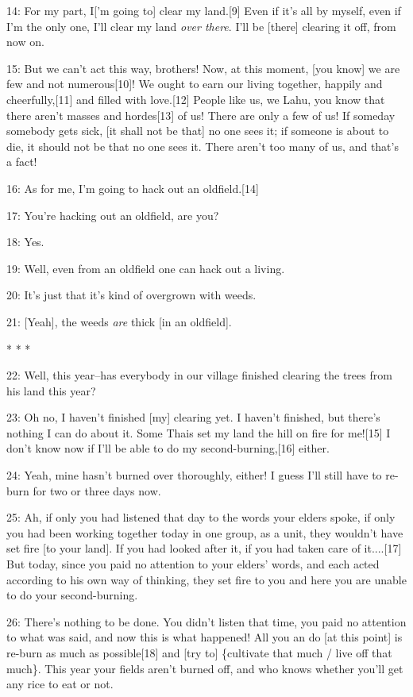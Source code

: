 14: For my part, I['m going to] clear my land.[9] Even if it's all by myself, even
if I'm the only one, I'll clear my land \textit{over there}. I'll be [there] clearing
it off, from now on.

15: But we can't act this way, brothers! Now, at this moment, [you know] we are
few and not numerous[10]! We ought to earn our living together, happily and cheerfully,[11]
and filled with love.[12] People like us, we Lahu, you know that there aren't masses
and hordes[13] of us! There are only a few of us! If someday somebody gets sick,
[it shall not be that] no one sees it; if someone is about to die, it should not
be that no one sees it. There aren't too many of us, and that's a fact!

16: As for me, I'm going to hack out an oldfield.[14]

17: You're hacking out an oldfield, are you?

18: Yes.

19: Well, even from an oldfield one can hack out a living.

20: It's just that it's kind of overgrown with weeds.

21: [Yeah], the weeds \textit{are} thick [in an oldfield].

\begin{center}
* * *
\end{center}

\leftskip=0pt
22: Well, this year--has everybody in our village finished clearing the trees from
his land this year?

23: Oh no, I haven't finished [my] clearing yet. I haven't finished, but there's
nothing I can do about it. Some Thais set my land the hill on fire for me![15]
I don't know now if I'll be able to do my second-burning,[16] either.

24: Yeah, mine hasn't burned over thoroughly, either! I guess I'll still have to
re-burn for two or three days now.

25: Ah, if only you had listened that day to the words your elders spoke, if only
you had been working together today in one group, as a unit, they wouldn't have
set fire [to your land]. If you had looked after it, if you had taken care of it....[17]
But today, since you paid no attention to your elders' words, and each acted according
to his own way of thinking, they set fire to you and here you are unable to do
your second-burning.

26: There's nothing to be done. You didn't listen that time, you paid no attention
to what was said, and now this is what happened! All you an do [at this point]
is re-burn as much as possible[18] and [try to] \{cultivate that much / live off
that much\}. This year your fields aren't burned off, and who knows whether you'll
get any rice to eat or not.

